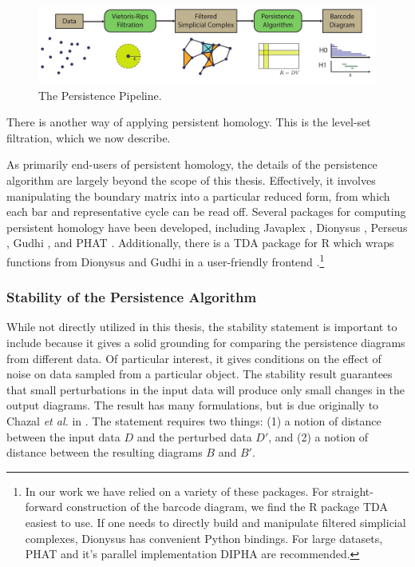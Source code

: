 \begin{figure}[t]
\centering
\includegraphics[]{./fig/background/persistence_pipeline.pdf}
\caption[The Persistence Pipeline]{The Persistence Pipeline.}
\label{fig:bg:persistence_pipeline}
\end{figure}

There is another way of applying persistent homology.
This is the level-set filtration, which we now describe.

As primarily end-users of persistent homology, the details of the persistence algorithm are largely beyond the scope of this thesis.
Effectively, it involves manipulating the boundary matrix into a particular reduced form, from which each bar and representative cycle can be read off.
Several packages for computing persistent homology have been developed, including Javaplex \cite{Tausz:2011}, Dionysus \cite{Morozov:2012}, Perseus \cite{Nanda:2013}, Gudhi \cite{maria:hal-01108461}, and PHAT \cite{Bauer:PHAT:2015}.
Additionally, there is a TDA package for R which wraps functions from Dionysus and Gudhi in a user-friendly frontend \cite{Fasy:TDA:2015}.\footnote{In our work we have relied on a variety of these packages. For straight-forward construction of the barcode diagram, we find the R package TDA easiest to use. If one needs to directly build and manipulate filtered simplicial complexes, Dionysus has convenient Python bindings. For large datasets, PHAT and it's parallel implementation DIPHA \cite{Bauer:DIPHA:2015,Bauer:2014gd} are recommended.}

\subsubsection{Stability of the Persistence Algorithm}
\label{bg:tda:ph:stability}

While not directly utilized in this thesis, the stability statement is important to include because it gives a solid grounding for comparing the persistence diagrams from different data.
Of particular interest, it gives conditions on the effect of noise on data sampled from a particular object.
The stability result guarantees that small perturbations in the input data will produce only small changes in the output diagrams.
The result has many formulations, but is due originally to Chazal \emph{et al.} in \cite{Chazal:2009wc}.
The statement requires two things: (1) a notion of distance between the input data $D$ and the perturbed data $D'$, and (2) a notion of distance between the resulting diagrams $B$ and $B'$.

